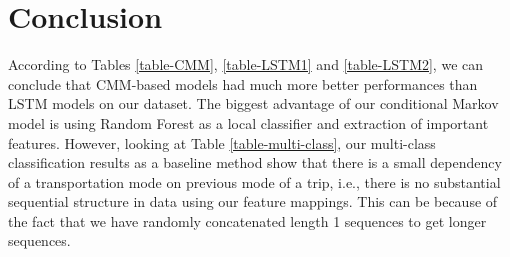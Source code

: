 \documentclass[11pt]{myclass}
\begin{document}
\section{Conclusion}

According to Tables \ref{table-CMM}, \ref{table-LSTM1} and \ref{table-LSTM2}, we can conclude that CMM-based models had much more better performances than LSTM models on our dataset. The biggest advantage of our conditional Markov model is using Random Forest as a local classifier and extraction of important features. However, looking at Table \ref{table-multi-class}, our multi-class classification results as a baseline method show that there is a small dependency of a transportation mode on previous mode of a trip, i.e., there is no substantial sequential structure in data using our feature mappings. This can be because of the fact that we have randomly concatenated length 1 sequences to get longer sequences. 



\end{document}

